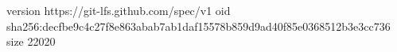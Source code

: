 version https://git-lfs.github.com/spec/v1
oid sha256:decfbe9c4c27f8e863abab7ab1daf15578b859d9ad40f85e0368512b3e3cc736
size 22020
